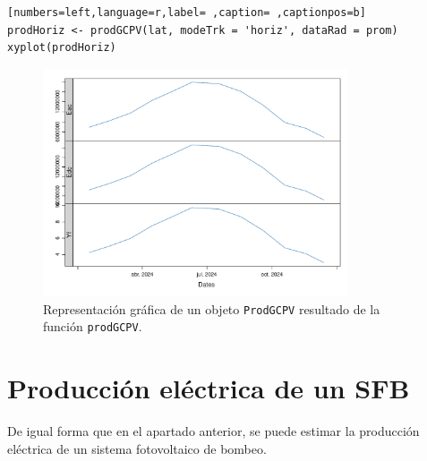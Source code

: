 \begin{lstlisting}[numbers=left,language=r,label= ,caption= ,captionpos=b]
prodHoriz <- prodGCPV(lat, modeTrk = 'horiz', dataRad = prom)
xyplot(prodHoriz)
\end{lstlisting}

\begin{figure}[!htb]
\centering
\includegraphics[width=0.8\textwidth]{figuras/codigo-prodgcpv.pdf}
\caption{Representación gráfica de un objeto \texttt{ProdGCPV} resultado de la función \texttt{prodGCPV}.}
\end{figure}

\section{Producción eléctrica de un SFB}
\label{sec:org20d30b9}
De igual forma que en el apartado anterior, se puede estimar la producción eléctrica de un sistema fotovoltaico de bombeo.


